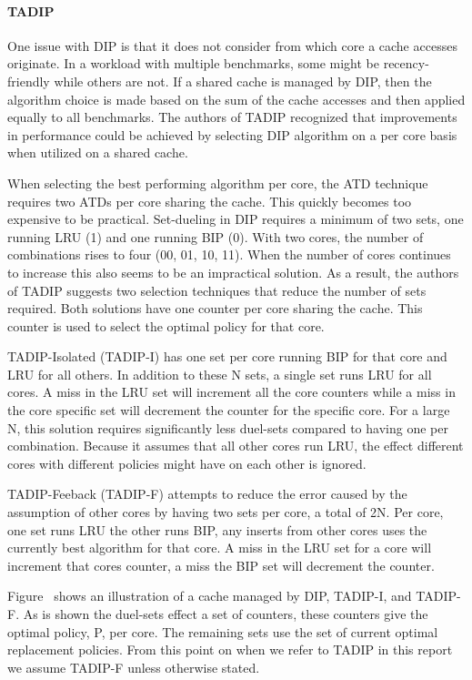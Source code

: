 \paragraph{TADIP}

One issue with DIP is that it does not consider from which core a cache accesses originate.
In a workload with multiple benchmarks, some might be recency-friendly while others are not. 
If a shared cache is managed by DIP, then the algorithm choice is made based on the sum of the cache accesses and then applied equally to all benchmarks.
The authors of TADIP recognized that improvements in performance could be achieved by selecting DIP algorithm on a per core basis when utilized on a shared cache.

When selecting the best performing algorithm per core, the ATD technique requires two ATDs per core sharing the cache. 
This quickly becomes too expensive to be practical.
Set-dueling in DIP requires a minimum of two sets, one running LRU (1) and one running BIP (0). 
With two cores, the number of combinations rises to four (00, 01, 10, 11).
When the number of cores continues to increase this also seems to be an impractical solution.
As a result, the authors of TADIP suggests two selection techniques that reduce the number of sets required. 
Both solutions have one counter per core sharing the cache.
This counter is used to select the optimal policy for that core.

TADIP-Isolated (TADIP-I) has one set per core running BIP for that core and LRU for all others.
In addition to these N sets, a single set runs LRU for all cores. 
A miss in the LRU set will increment all the core counters while a miss in the core specific set will decrement the counter for the specific core.
For a large N, this solution requires significantly less duel-sets compared to having one per combination. 
Because it assumes that all other cores run LRU, the effect different cores with different policies might have on each other is ignored.

TADIP-Feeback (TADIP-F) attempts to reduce the error caused by the assumption of other cores by having two sets per core, a total of 2N.
Per core, one set runs LRU the other runs BIP, any inserts from other cores uses the currently best algorithm for that core.
A miss in the LRU set for a core will increment that cores counter, a miss the BIP set will decrement the counter.


Figure~ shows an illustration of a cache managed by DIP, TADIP-I, and TADIP-F. 
As is shown the duel-sets effect a set of counters, these counters give the optimal policy, P, per core. 
The remaining sets use the set of current optimal replacement policies.
From this point on when we refer to TADIP in this report we assume TADIP-F unless otherwise stated.

